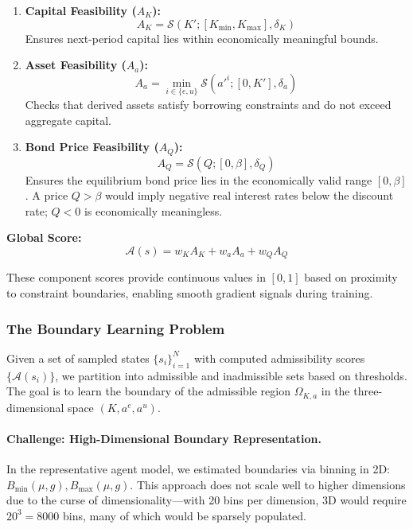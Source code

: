 \begin{enumerate}
    \item \textbf{Capital Feasibility ($A_K$):}
    \begin{equation}
        A_K = \mathcal{S}(K'; [K_{\min}, K_{\max}], \delta_K)
    \end{equation}
    Ensures next-period capital lies within economically meaningful bounds.
    
    \item \textbf{Asset Feasibility ($A_a$):}
    \begin{equation}
        A_a = \min_{i \in \{e, u\}} \mathcal{S}(a'^i; [0, K'], \delta_a)
    \end{equation}
    Checks that derived assets satisfy borrowing constraints and do not exceed aggregate capital.
    
    \item \textbf{Bond Price Feasibility ($A_Q$):}
    \begin{equation}
        A_Q = \mathcal{S}(Q; [0, \beta], \delta_Q)
    \end{equation}
    Ensures the equilibrium bond price lies in the economically valid range $[0, \beta]$. A price $Q > \beta$ would imply negative real interest rates below the discount rate; $Q < 0$ is economically meaningless.
\end{enumerate}

\textbf{Global Score:}
\begin{equation}
    \mathcal{A}(s) = w_K A_K + w_a A_a + w_Q A_Q
\end{equation}

These component scores provide continuous values in $[0, 1]$ based on proximity to constraint boundaries, enabling smooth gradient signals during training.


\subsubsection{The Boundary Learning Problem}

Given a set of sampled states $\{s_i\}_{i=1}^N$ with computed admissibility scores $\{\mathcal{A}(s_i)\}$, we partition into admissible and inadmissible sets based on thresholds. The goal is to learn the boundary of the admissible region $\Omega_{K,a}$ in the three-dimensional space $(K, a^e, a^u)$.

\paragraph{Challenge: High-Dimensional Boundary Representation.}
In the representative agent model, we estimated boundaries via binning in 2D: $B_{\min}(\mu, g), B_{\max}(\mu, g)$. This approach does not scale well to higher dimensions due to the curse of dimensionality—with 20 bins per dimension, 3D would require $20^3 = 8000$ bins, many of which would be sparsely populated.

